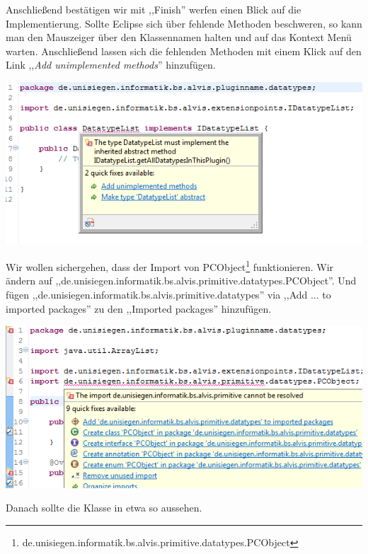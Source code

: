 \documentclass[10pt,a4paper]{article}
\begin{document}
Anschließend bestätigen wir mit ,,Finish'' werfen einen Blick auf die Implementierung.
Sollte Eclipse sich über fehlende Methoden beschweren, so kann man den Mauszeiger über den Klassennamen halten und auf das Kontext Menü warten. Anschließend lassen sich die fehlenden Methoden mit einem Klick auf den Link ,,\textit{Add unimplemented methods}'' hinzufügen.

\begin{center}
\includegraphics[scale=0.48]{images/new_plugin_datatypeslist_01}
\end{center}

Wir wollen sichergehen, dass der Import von PCObject\footnote{de.unisiegen.informatik.bs.alvis.primitive.datatypes.PCObject} funktionieren. Wir ändern auf ,,de.unisiegen.informatik.bs.alvis.primitive.datatypes.PCObject''. Und fügen ,,de.unisiegen.informatik.bs.alvis.primitive.datatypes'' via ,,Add ... to imported packages'' zu den ,,Imported packages'' hinzufügen.


\begin{center}
\includegraphics[scale=0.48]{images/new_plugin_datatypeslist_02}
\end{center}

Danach sollte die Klasse in etwa so aussehen.

\end{document}
